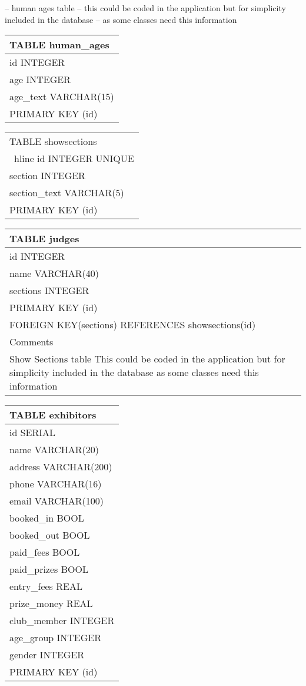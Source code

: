 \documentclass[a4paper,11pt]{report}
\begin{document}
-- human ages table
-- this could be coded in the application but for simplicity included in the database
-- as some classes need this information
\newline 
\begin{tabular}{|p{15cm}|}  \hline
TABLE human\_ages \\ \hline
id INTEGER\\
age INTEGER\\
age\_text VARCHAR(15)\\
PRIMARY KEY (id)\\ \hline
\end{tabular}
\newline 
\begin{tabular}{|p{15cm}|}  \hline
TABLE showsections \\ \ hline
id INTEGER UNIQUE\\
section INTEGER\\
section\_text VARCHAR(5)\\
PRIMARY KEY (id) \\ \hline
\end{tabular}
\newline
\begin{tabular}{|p{15cm}|}  \hline
TABLE judges\\ \hline
id INTEGER\\
name VARCHAR(40)\\
sections INTEGER\\
PRIMARY KEY (id)\\
FOREIGN KEY(sections) REFERENCES showsections(id)\\ \hline
Comments\\\hline
Show Sections table 
This could be coded in the application but for simplicity included in the database
as some classes need this information \\ \hline
\end{tabular}
\newline \newline
\begin{tabular}{|p{15cm}|}  \hline
TABLE exhibitors \\ \hline
id SERIAL\\
name VARCHAR(20)\\   
address VARCHAR(200)\\
phone VARCHAR(16)\\
email VARCHAR(100)\\
booked\_in BOOL\\
booked\_out BOOL\\
paid\_fees BOOL\\
paid\_prizes BOOL\\ 
entry\_fees REAL\\
prize\_money REAL\\
club\_member INTEGER\\
age\_group INTEGER\\
gender INTEGER\\
PRIMARY KEY (id)\\ \hline
\end{tabular}
\end{document}

